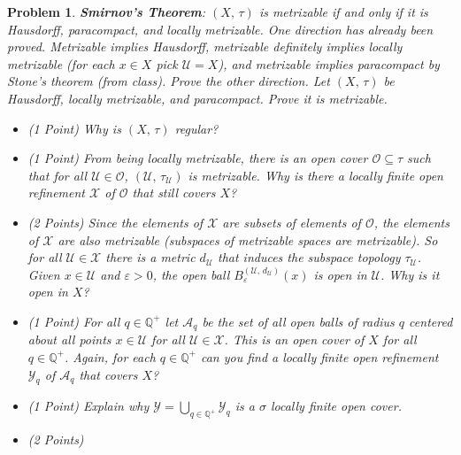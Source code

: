\documentclass{article}
\theoremstyle{normal}
\newtheorem{problem}{Problem}
\begin{document}
\begin{problem}
        \textbf{Smirnov's Theorem}: $(X,\,\tau)$ is metrizable if and only if
        it is Hausdorff, paracompact, and locally metrizable. One direction has
        already been proved. Metrizable implies Hausdorff, metrizable definitely
        implies locally metrizable (for each $x\in{X}$ pick $\mathcal{U}=X$),
        and metrizable implies paracompact by Stone's theorem (from class).
        Prove the other direction. Let $(X,\,\tau)$ be Hausdorff, locally
        metrizable, and paracompact. Prove it is metrizable.
        \begin{itemize}
            \item (1 Point) Why is $(X,\,\tau)$ regular?
            \item (1 Point) From being locally metrizable, there is an open
                cover $\mathcal{O}\subseteq\tau$ such that for all
                $\mathcal{U}\in\mathcal{O}$,
                $(\mathcal{U},\,\tau_{\mathcal{U}})$ is metrizable. Why is there
                a locally finite open refinement $\mathcal{X}$ of $\mathcal{O}$
                that still covers $X$?
            \item (2 Points)
                Since the elements of $\mathcal{X}$ are subsets of elements
                of $\mathcal{O}$, the elements of $\mathcal{X}$ are also
                metrizable (subspaces of metrizable spaces are metrizable).
                So for all $\mathcal{U}\in\mathcal{X}$ there is a metric
                $d_{\mathcal{U}}$ that induces the subspace topology
                $\tau_{\mathcal{U}}$. Given $x\in\mathcal{U}$ and
                $\varepsilon>0$, the open ball
                $B_{\varepsilon}^{(\mathcal{U},\,d_{\mathcal{U}})}(x)$ is
                open in $\mathcal{U}$. Why is it open in $X$?
            \item (1 Point)
                For all $q\in\mathbb{Q}^{+}$ let $\mathcal{A}_{q}$ be the set
                of all open balls of radius $q$ centered about all points
                $x\in\mathcal{U}$ for all $\mathcal{U}\in\mathcal{X}$. This is
                an open cover of $X$ for all $q\in\mathbb{Q}^{+}$. Again, for
                each $q\in\mathbb{Q}^{+}$ can you find a locally finite open
                refinement $\mathcal{Y}_{q}$ of $\mathcal{A}_{q}$ that covers
                $X$?
            \item (1 Point)
                Explain why $\mathcal{Y}=\bigcup_{q\in\mathbb{Q}^{+}}\mathcal{Y}_{q}$
                is a $\sigma$ locally finite open cover.
            \item (2 Points)

\end{itemize}
\end{problem}
\end{document}
